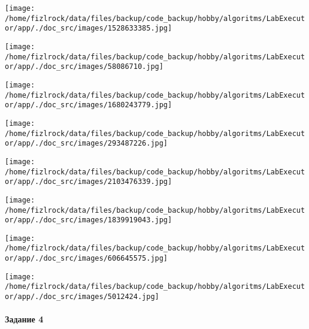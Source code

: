 \documentclass[a4paper, 12pt]{article}
\begin{document}
\texttt{[image: /home/fizlrock/data/files/backup/code\_backup/hobby/algoritms/LabExecutor/app/./doc\_src/images/1528633385.jpg]}

\texttt{[image: /home/fizlrock/data/files/backup/code\_backup/hobby/algoritms/LabExecutor/app/./doc\_src/images/58086710.jpg]}

\texttt{[image: /home/fizlrock/data/files/backup/code\_backup/hobby/algoritms/LabExecutor/app/./doc\_src/images/1680243779.jpg]}

\texttt{[image: /home/fizlrock/data/files/backup/code\_backup/hobby/algoritms/LabExecutor/app/./doc\_src/images/293487226.jpg]}

\texttt{[image: /home/fizlrock/data/files/backup/code\_backup/hobby/algoritms/LabExecutor/app/./doc\_src/images/2103476339.jpg]}

\texttt{[image: /home/fizlrock/data/files/backup/code\_backup/hobby/algoritms/LabExecutor/app/./doc\_src/images/1839919043.jpg]}

\texttt{[image: /home/fizlrock/data/files/backup/code\_backup/hobby/algoritms/LabExecutor/app/./doc\_src/images/606645575.jpg]}

\texttt{[image: /home/fizlrock/data/files/backup/code\_backup/hobby/algoritms/LabExecutor/app/./doc\_src/images/5012424.jpg]}
\pagebreak
\paragraph{Задание 4}
\end{document}
